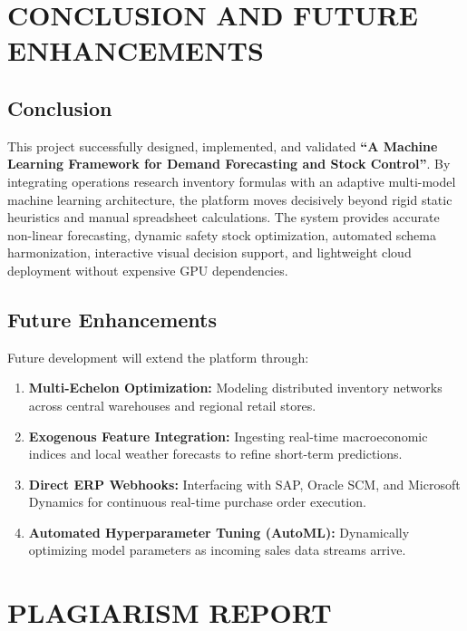 \documentclass[12pt,a4paper]{report}
\begin{document}
\newpage
\chapter{CONCLUSION AND FUTURE ENHANCEMENTS}

\section{Conclusion}
This project successfully designed, implemented, and validated \textbf{``A Machine Learning Framework for Demand Forecasting and Stock Control''}. By integrating operations research inventory formulas with an adaptive multi-model machine learning architecture, the platform moves decisively beyond rigid static heuristics and manual spreadsheet calculations. The system provides accurate non-linear forecasting, dynamic safety stock optimization, automated schema harmonization, interactive visual decision support, and lightweight cloud deployment without expensive GPU dependencies.

\section{Future Enhancements}
Future development will extend the platform through:
\begin{enumerate}
    \item \textbf{Multi-Echelon Optimization:} Modeling distributed inventory networks across central warehouses and regional retail stores.
    \item \textbf{Exogenous Feature Integration:} Ingesting real-time macroeconomic indices and local weather forecasts to refine short-term predictions.
    \item \textbf{Direct ERP Webhooks:} Interfacing with SAP, Oracle SCM, and Microsoft Dynamics for continuous real-time purchase order execution.
    \item \textbf{Automated Hyperparameter Tuning (AutoML):} Dynamically optimizing model parameters as incoming sales data streams arrive.
\end{enumerate}

\newpage
\chapter*{PLAGIARISM REPORT}
\end{document}
